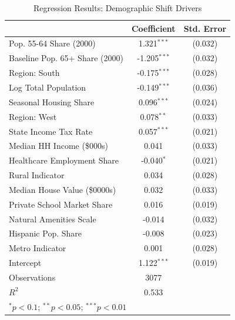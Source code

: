 \begin{table}[htbp]
    \centering
    \caption{Regression Results: Demographic Shift Drivers}
    \label{tab:regression}
    \begin{tabular}{lcc}
    \hline\hline
     & Coefficient & Std. Error \\
    \hline
    Pop. 55-64 Share (2000) & 1.321$^{***}$ & (0.032) \\
    Baseline Pop. 65+ Share (2000) & -1.205$^{***}$ & (0.032) \\
    Region: South & -0.175$^{***}$ & (0.028) \\
    Log Total Population & -0.149$^{***}$ & (0.036) \\
    Seasonal Housing Share & 0.096$^{***}$ & (0.024) \\
    Region: West & 0.078$^{**}$ & (0.033) \\
    State Income Tax Rate & 0.057$^{***}$ & (0.021) \\
    Median HH Income (\$000s) & 0.041 & (0.033) \\
    Healthcare Employment Share & -0.040$^{*}$ & (0.021) \\
    Rural Indicator & 0.034 & (0.028) \\
    Median House Value (\$0000s) & 0.032 & (0.033) \\
    Private School Market Share & 0.016 & (0.019) \\
    Natural Amenities Scale & -0.014 & (0.032) \\
    Hispanic Pop. Share & -0.008 & (0.023) \\
    Metro Indicator & 0.001 & (0.028) \\
    Intercept & 1.122$^{***}$ & (0.019) \\
    \hline
    Observations & 3077 & \\
    $R^2$ & 0.533 & \\
    \hline\hline
    \multicolumn{3}{l}{\footnotesize $^{*}p<0.1$; $^{**}p<0.05$; $^{***}p<0.01$} \\
    \end{tabular}
    \end{table}
